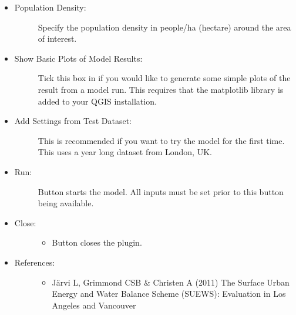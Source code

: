\documentclass[letterpaper,10pt,english]{sphinxmanual}
\begin{document}
\begin{itemize}
\begin{description}
\end{description}

\item {} \begin{description}
\item[{Population Density:}] \leavevmode
Specify the population density in people/ha (hectare) around the area of interest.

\end{description}

\item {} \begin{description}
\item[{Show Basic Plots of Model Results:}] \leavevmode
Tick this box in if you would like to generate some simple plots of the result from a model run. This requires that the matplotlib library is added to your QGIS installation.

\end{description}

\item {} \begin{description}
\item[{Add Settings from Test Dataset:}] \leavevmode
This is recommended if you want to try the model for the first time. This uses a year long dataset from London, UK.

\end{description}

\item {} \begin{description}
\item[{Run:}] \leavevmode
Button starts the model. All inputs must be set prior to this button being available.

\end{description}

\item {} \begin{description}
\item[{Close:}] \leavevmode\begin{itemize}
\item {} 
Button closes the plugin.

\end{itemize}

\end{description}

\item {} \begin{description}
\item[{References:}] \leavevmode\begin{itemize}
\item {} 
Järvi L, Grimmond CSB \& Christen A (2011) The Surface Urban Energy and Water Balance Scheme (SUEWS): Evaluation in Los Angeles and Vancouver 


\end{itemize}
\end{description}
\end{itemize}
\end{document}
